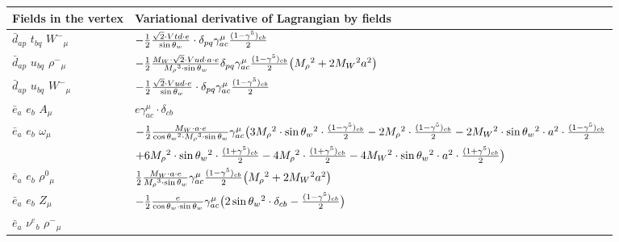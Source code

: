 \begin{center}
\begin{tabular}{|l|l|} \hline
Fields in the vertex & Variational derivative of Lagrangian by fields \\ \hline
$\bar{d}{}_{a p }$ \phantom{-} $t{}_{b q }$ \phantom{-} $W^-{}_{\mu }$ \phantom{-}  &
	$-\frac{1}{2}\frac{\sqrt{2} \cdot Vtd \cdot e}{ \sin{\theta}_w}\cdot \delta_{p q} \gamma_{a c}^\mu {(1-\gamma^5)_{c b}\over 2} $\\[2mm]
$\bar{d}{}_{a p }$ \phantom{-} $u{}_{b q }$ \phantom{-} $\rho^-{}_{\mu }$ \phantom{-}  &
	$-\frac{1}{2}\frac{ M_W \cdot\sqrt{2} \cdot Vud \cdot a \cdot e}{ M_\rho{}^3  \cdot \sin{\theta}_w}\delta_{p q} \gamma_{a c}^\mu {(1-\gamma^5)_{c b}\over 2} \big( M_\rho{}^2 +2 M_W{}^2  a{}^2 \big)$\\[2mm]
$\bar{d}{}_{a p }$ \phantom{-} $u{}_{b q }$ \phantom{-} $W^-{}_{\mu }$ \phantom{-}  &
	$-\frac{1}{2}\frac{\sqrt{2} \cdot Vud \cdot e}{ \sin{\theta}_w}\cdot \delta_{p q} \gamma_{a c}^\mu {(1-\gamma^5)_{c b}\over 2} $\\[2mm]
$\bar{e}{}_{a }$ \phantom{-} $e{}_{b }$ \phantom{-} ${A}_{\mu }$ \phantom{-}  &
	$ e\gamma_{a c}^\mu \cdot \delta_{c b} $\\[2mm]
$\bar{e}{}_{a }$ \phantom{-} $e{}_{b }$ \phantom{-} $\omega{}_{\mu }$ \phantom{-}  &
	$-\frac{1}{2}\frac{ M_W \cdot a \cdot e}{ \cos{\theta}_w{}^2  \cdot M_\rho{}^3  \cdot \sin{\theta}_w}\gamma_{a c}^\mu \big(3 M_\rho{}^2 \cdot  \sin{\theta}_w{}^2 \cdot {(1-\gamma^5)_{c b}\over 2} -2 M_\rho{}^2 \cdot {(1-\gamma^5)_{c b}\over 2} -2 M_W{}^2 \cdot  \sin{\theta}_w{}^2 \cdot  a{}^2 \cdot {(1-\gamma^5)_{c b}\over 2} $ \\[2mm]
  & $+6 M_\rho{}^2 \cdot  \sin{\theta}_w{}^2 \cdot {(1+\gamma^5)_{c b}\over 2} -4 M_\rho{}^2 \cdot {(1+\gamma^5)_{c b}\over 2} -4 M_W{}^2 \cdot  \sin{\theta}_w{}^2 \cdot  a{}^2 \cdot {(1+\gamma^5)_{c b}\over 2} \big)$\\[2mm]
$\bar{e}{}_{a }$ \phantom{-} $e{}_{b }$ \phantom{-} $\rho^0{}_{\mu }$ \phantom{-}  &
	$\frac{1}{2}\frac{ M_W \cdot a \cdot e}{ M_\rho{}^3  \cdot \sin{\theta}_w}\gamma_{a c}^\mu {(1-\gamma^5)_{c b}\over 2} \big( M_\rho{}^2 +2 M_W{}^2  a{}^2 \big)$\\[2mm]
$\bar{e}{}_{a }$ \phantom{-} $e{}_{b }$ \phantom{-} ${Z}_{\mu }$ \phantom{-}  &
	$-\frac{1}{2}\frac{ e}{ \cos{\theta}_w \cdot \sin{\theta}_w}\gamma_{a c}^\mu \big(2 \sin{\theta}_w{}^2 \cdot \delta_{c b} -{(1-\gamma^5)_{c b}\over 2} \big)$\\[2mm]
$\bar{e}{}_{a }$ \phantom{-} $\nu^e{}_{b }$ \phantom{-} $\rho^-{}_{\mu }$ \phantom{-}  &

\end{tabular}
\end{center}
